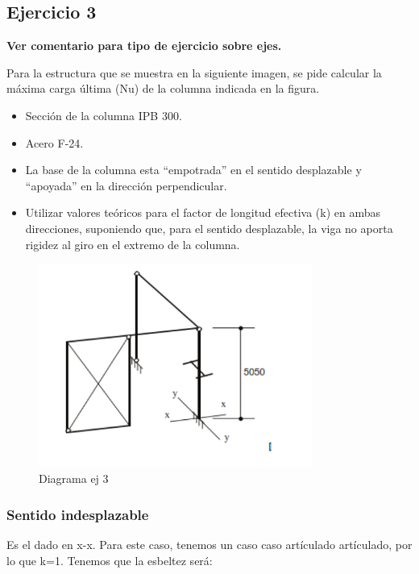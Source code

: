 \documentclass[../main.tex]{subfiles}
\begin{document}
\subsection{Ejercicio 3}

\textbf{Ver comentario para tipo de ejercicio sobre ejes.}

Para la estructura que se muestra en la siguiente imagen, se pide calcular la
máxima carga última (Nu) de la columna indicada en la figura.

\begin{itemize}
  \item Sección de la columna IPB 300.
  \item Acero F-24.
  \item La base de la columna esta “empotrada” en el sentido desplazable y “apoyada” en la dirección
perpendicular.
\item Utilizar valores teóricos para el factor de longitud efectiva (k) en ambas direcciones, suponiendo
que, para el sentido desplazable, la viga no aporta rigidez al giro en el extremo de la columna.
\end{itemize}

\begin{figure}[htpb]
  \centering
  \includegraphics[width=0.8\textwidth]{../images/20210419/ej3}
  \caption{Diagrama ej 3}
  \label{fig:ej3}
\end{figure}

\subsubsection{Sentido indesplazable}

Es el dado en x-x. Para este caso, tenemos un caso caso artículado artículado,
por lo que k=1. Tenemos que la esbeltez será:
\end{document}

